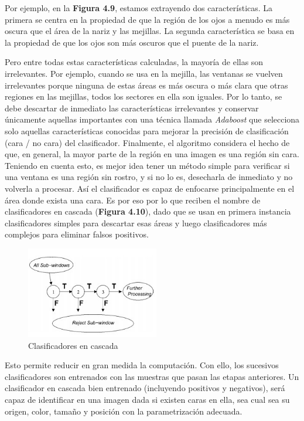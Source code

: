 Por ejemplo, en la \textbf{Figura 4.9}, estamos extrayendo dos características. La primera se centra en la propiedad de que la región de los ojos a menudo es más oscura que el área de la nariz y las mejillas. La segunda característica se basa en la propiedad de que los ojos son más oscuros que el puente de la nariz.

Pero entre todas estas características calculadas, la mayoría de ellas son irrelevantes. Por ejemplo, cuando se usa en la mejilla, las ventanas se vuelven irrelevantes porque ninguna de estas áreas es más oscura o más clara que otras regiones en las mejillas, todos los sectores en ella son iguales. Por lo tanto, se debe descartar de inmediato las características irrelevantes y conservar únicamente aquellas importantes con una técnica llamada \textit{Adaboost} que selecciona solo aquellas características conocidas para mejorar la precisión de clasificación (cara / no cara) del clasificador. Finalmente, el algoritmo considera el hecho de que, en general, la mayor parte de la región en una imagen es una región sin cara. Teniendo en cuenta esto, es mejor idea tener un método simple para verificar si una ventana es una región sin rostro, y si no lo es, desecharla de inmediato y no volverla a procesar. Así el clasificador es capaz de enfocarse principalmente en el área donde exista una cara. Es por eso por lo que reciben el nombre de clasificadores en cascada (\textbf{Figura 4.10}), dado que se usan en primera instancia clasificadores simples para descartar esas áreas y luego clasificadores más complejos para eliminar falsos positivos.

\begin{figure}[H]
  \begin{center}
    \includegraphics[width=0.50\linewidth, height=4cm]{figures/cascade.jpg}
		\caption{Clasificadores en cascada}
		\label{fig.cascade}
		\end{center}
\end{figure}

Esto permite reducir en gran medida la computación. Con ello, los sucesivos clasificadores son entrenados con las muestras que pasan las etapas anteriores. Un clasificador en cascada bien entrenado (incluyendo positivos y negativos), será capaz de identificar en una imagen dada si existen caras en ella, sea cual sea su origen, color, tamaño y posición con la parametrización adecuada.

